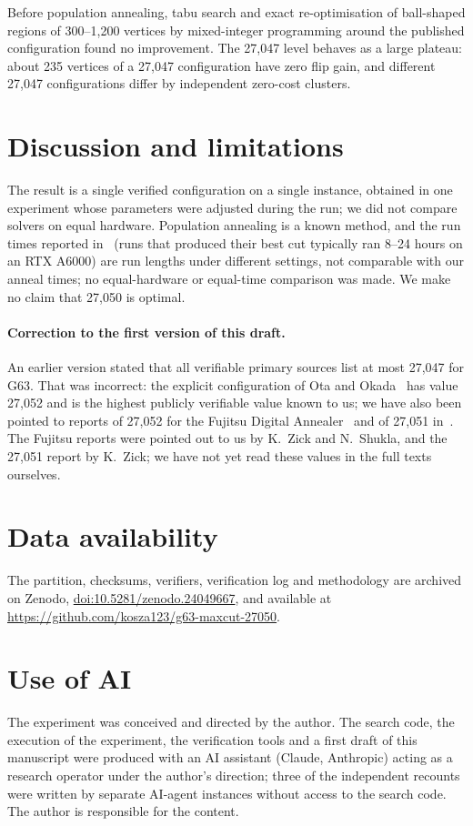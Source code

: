 \documentclass[11pt]{article}
\begin{document}
Before population annealing, tabu search and exact re-optimisation of ball-shaped regions of 300--1,200 vertices by
mixed-integer programming around the published configuration found no improvement. The 27,047 level behaves as a large plateau:
about 235 vertices of a 27,047 configuration have zero flip gain, and different 27,047 configurations differ by independent
zero-cost clusters.

\section{Discussion and limitations}
The result is a single verified configuration on a single instance, obtained in one experiment whose parameters were adjusted
during the run; we did not compare solvers on equal hardware. Population annealing is a known method, and the run times reported
in~\cite{khan2025} (runs that produced their best cut typically ran 8--24 hours on an RTX A6000) are run lengths under different
settings, not comparable with our anneal times; no equal-hardware or equal-time comparison was made. We make no claim that 27,050 is optimal.

\paragraph{Correction to the first version of this draft.} An earlier version stated that all verifiable primary sources list at most
27,047 for G63. That was incorrect: the explicit configuration of Ota and Okada~\cite{otaokada2026} has value 27,052 and is the highest
publicly verifiable value known to us; we have also been pointed to reports of 27,052 for the Fujitsu Digital
Annealer~\cite{matsubara2020,takemoto2021} and of 27,051 in~\cite{ju2026}. The Fujitsu reports were pointed out to us by K.~Zick and N.~Shukla, and the 27,051 report by K.~Zick; we have not yet read
these values in the full texts ourselves.

\section*{Data availability}
The partition, checksums, verifiers, verification log and methodology are archived on Zenodo,
\href{https://doi.org/10.5281/zenodo.24049667}{doi:10.5281/zenodo.24049667}, and available at \url{https://github.com/kosza123/g63-maxcut-27050}.

\section*{Use of AI}
The experiment was conceived and directed by the author. The search code, the execution of the experiment, the verification
tools and a first draft of this manuscript were produced with an AI assistant (Claude, Anthropic) acting as a research operator
under the author's direction; three of the independent recounts were written by separate AI-agent instances without access to the
search code. The author is responsible for the content.
\end{document}
